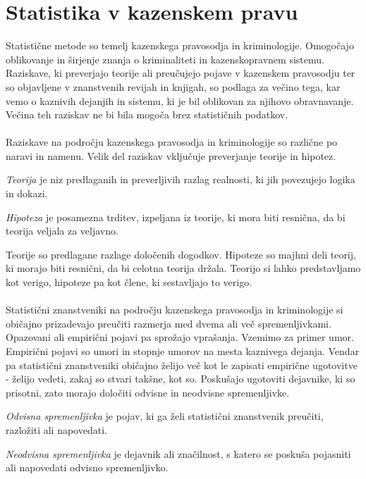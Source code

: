 \documentclass[fin1, tisk]{fmfdelo}
\theoremstyle{definition}
\theoremstyle{trditev}
\theoremstyle{izrek}
\begin{document}
\section{Statistika v kazenskem pravu}
Statistične metode so temelj kazenskega pravosodja in kriminologije. Omogočajo oblikovanje in širjenje znanja o kriminaliteti in kazenskopravnem 
sistemu. Raziskave, ki preverjajo teorije ali preučujejo pojave v kazenskem pravosodju ter so objavljene v znanstvenih revijah in knjigah, so 
podlaga za večino tega, kar vemo o kaznivih dejanjih in sistemu, ki je bil oblikovan za njihovo obravnavanje. Večina teh raziskav ne bi bila mogoča 
brez statističnih podatkov.\\\\
Raziskave na področju kazenskega pravosodja in kriminologije so različne po naravi in namenu. Velik del raziskav vključuje preverjanje teorije 
in hipotez. 
\begin{definicija}
    \textit{Teorija} je niz predlaganih in preverljivih razlag realnosti, ki jih povezujejo logika in dokazi.
\end{definicija}
\begin{definicija}
    \textit{Hipoteza} je posamezna trditev, izpeljana iz teorije, ki mora biti resnična, da bi teorija veljala za veljavno.
\end{definicija}
Teorije so predlagane razlage določenih dogodkov. Hipoteze so majhni deli teorij, ki morajo biti resnični, da bi celotna teorija držala. Teorijo 
si lahko predstavljamo kot verigo, hipoteze pa kot člene, ki sestavljajo to verigo.\\\\
Statistični znanstveniki na področju kazenskega pravosodja in kriminologije si običajno prizadevajo preučiti razmerja med dvema ali več spremenljivkami. 
Opazovani ali empirični pojavi pa sprožajo vprašanja. Vzemimo za primer umor. Empirični pojavi so umori in stopnje umorov na mesta kaznivega 
dejanja. Vendar pa statistični znanstveniki običajno želijo več kot le zapisati empirične ugotovitve - želijo vedeti, zakaj so stvari takšne, kot so. 
Poskušajo ugotoviti dejavnike, ki so prisotni, zato morajo določiti odvisne in neodvisne spremenljivke.
\begin{definicija}
    \textit{Odvisna spremenljivka} je pojav, ki ga želi statistični znanstvenik preučiti, razložiti ali napovedati.
\end{definicija}
\begin{definicija}
    \textit{Neodvisna spremenljivka} je dejavnik ali značilnost, s katero se poskuša pojasniti ali napovedati odvisno spremenljivko.
\end{definicija}
\end{document}
